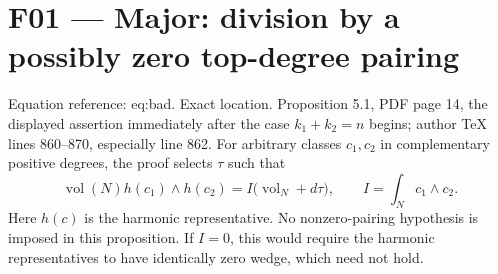 \documentclass[10pt]{article}
\begin{document}
\section*{F01 — Major: division by a possibly zero top-degree pairing}
Equation reference: eq:bad. Exact location. Proposition 5.1, PDF page 14, the displayed assertion immediately after the case \(k_1+k_2=n\) begins; author TeX lines 860–870, especially line 862. For arbitrary classes \(c_1,c_2\) in complementary positive degrees, the proof selects \(\tau\) such that \[
 \operatorname{vol}(N)h(c_1)\wedge h(c_2)
 = I\bigl(\operatorname{vol}_N+d\tau\bigr),\qquad
 I=\int_N c_1\wedge c_2 .\] Here \(h(c)\) is the harmonic representative. No nonzero-pairing hypothesis is imposed in this proposition. If \(I=0\), this would require the harmonic representatives to have identically zero wedge, which need not hold.\par
\end{document}
